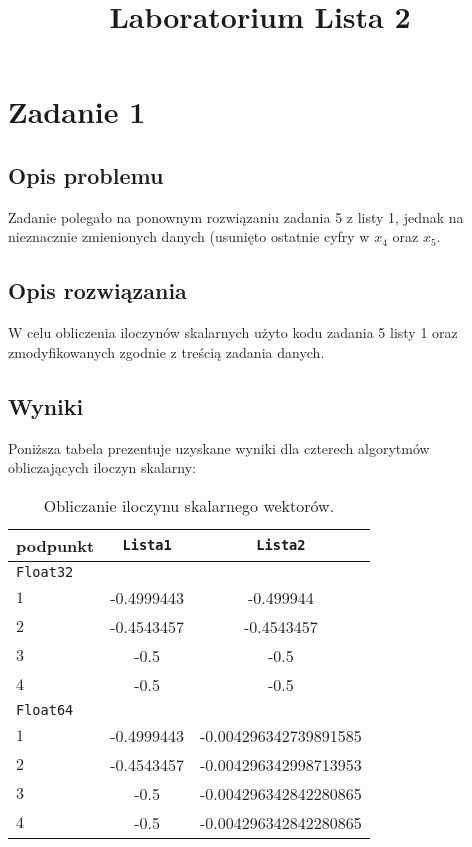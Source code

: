 \documentclass{classrep}
\author{
  \studentinfo{Agata Jasionowska}{229726}
}
\title{Laboratorium \ppauza Lista 2}
\begin{document}
\maketitle

\section{Zadanie 1}
	\subsection{Opis problemu}
		Zadanie polegało na ponownym rozwiązaniu zadania 5 z listy 1, jednak na nieznacznie zmienionych danych (usunięto ostatnie cyfry w $x_4$ oraz $x_5$. 
	\subsection{Opis rozwiązania}
		W celu obliczenia iloczynów skalarnych użyto kodu zadania 5 listy 1 oraz zmodyfikowanych zgodnie z treścią zadania danych.
	\subsection{Wyniki}
		Poniższa tabela prezentuje uzyskane wyniki dla czterech algorytmów obliczających iloczyn skalarny:
		\begin{table}[!h]
        	\centering
        	\footnotesize
			\begin{tabular}{lSS} \toprule
				{podpunkt} & {\texttt{Lista1}} & {\texttt{Lista2}} \\ \midrule
				\texttt{Float32} \\ \cmidrule(r) {1-3}
				$1$ & -0.4999443 & -0.499944 \\ 
	 			$2$ & -0.4543457 & -0.4543457 \\
	 			$3$ & -0.5 & -0.5 \\
	 			$4$ & -0.5 & -0.5 \\
	 			\texttt{Float64} \\ \cmidrule(r) {1-3}
	 			$1$ & -0.4999443 & -0.004296342739891585 \\ 
	 			$2$ & -0.4543457 & -0.004296342998713953 \\
	 			$3$ & -0.5 & -0.004296342842280865 \\
	 			$4$ & -0.5 & -0.004296342842280865 \\ \bottomrule
	 		\end{tabular}
	 		\caption{Obliczanie iloczynu skalarnego wektorów.}
			\label{table:1}
		\end{table}	
\end{document}
